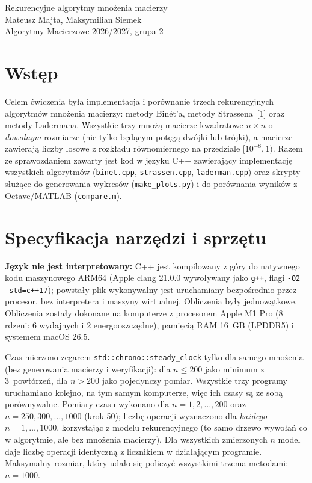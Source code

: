 \documentclass[11pt,a4paper]{article}
\begin{document}
\thispagestyle{plain}
\begin{center}
\vspace*{3.5cm}
{\Large Rekurencyjne algorytmy mnożenia macierzy}\\[1.5em]
Mateusz Majta, Maksymilian Siemek\\[1.2em]
Algorytmy Macierzowe 2026/2027, grupa 2
\end{center}
\vspace{1.2cm}
\tableofcontents
\newpage

\section{Wstęp}
Celem ćwiczenia była implementacja i porównanie trzech rekurencyjnych algorytmów mnożenia macierzy:
metody Binét'a, metody Strassena~[1] oraz metody Ladermana. Wszystkie trzy mnożą macierze kwadratowe
$n\times n$ o \emph{dowolnym} rozmiarze (nie tylko będącym potęgą dwójki lub trójki), a macierze zawierają liczby losowe
z rozkładu równomiernego na przedziale $[10^{-8}, 1)$.
Razem ze sprawozdaniem zawarty jest kod w języku C++ zawierający implementację wszystkich algorytmów
(\texttt{binet.cpp}, \texttt{strassen.cpp}, \texttt{laderman.cpp}) oraz skrypty służące do generowania
wykresów (\texttt{make\_plots.py}) i do porównania wyników z Octave/MATLAB (\texttt{compare.m}).

\section{Specyfikacja narzędzi i sprzętu}
\textbf{Język nie jest interpretowany:} C++ jest kompilowany z góry do natywnego kodu maszynowego ARM64
(Apple clang 21.0.0 wywoływany jako \texttt{g++}, flagi \texttt{-O2 -std=c++17}); powstały plik wykonywalny jest
uruchamiany bezpośrednio przez procesor, bez interpretera i maszyny wirtualnej. Obliczenia były jednowątkowe.
Obliczenia zostały dokonane na komputerze z procesorem Apple M1 Pro (8 rdzeni: 6 wydajnych i 2 energooszczędne),
pamięcią RAM 16~GB (LPDDR5) i systemem macOS 26.5.

Czas mierzono zegarem \texttt{std::chrono::steady\_clock} tylko dla samego mnożenia (bez generowania macierzy
i weryfikacji): dla $n\le200$ jako minimum z 3~powtórzeń, dla $n>200$ jako pojedynczy pomiar. Wszystkie trzy programy
uruchamiano kolejno, na tym samym komputerze, więc ich czasy są ze sobą porównywalne. Pomiary czasu wykonano dla
$n=1,2,\dots,200$ oraz $n=250,300,\dots,1000$ (krok 50); liczbę operacji wyznaczono dla \emph{każdego}
$n=1,\dots,1000$, korzystając z modelu rekurencyjnego (to samo drzewo wywołań co w algorytmie, ale bez mnożenia
macierzy). Dla wszystkich zmierzonych $n$ model daje liczbę operacji identyczną z licznikiem w działającym programie.
Maksymalny rozmiar, który udało się policzyć wszystkimi trzema metodami: $n=1000$.
\end{document}
